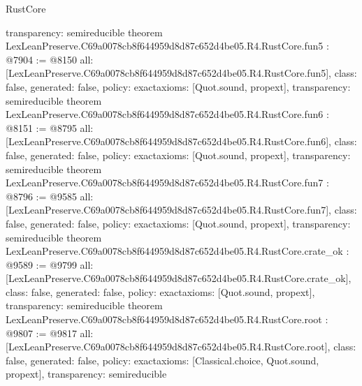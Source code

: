 \begin{lexlean}{RustCore}
\begin{coremodule}
{  transparency: semireducible
}
theorem LexLeanPreserve.C69a0078cb8f644959d8d87c652d4be05.R4.RustCore.fun5 : @7904 := @8150 {
  all: [LexLeanPreserve.C69a0078cb8f644959d8d87c652d4be05.R4.RustCore.fun5],
  class: false,
  generated: false,
  policy: exact{axioms: [Quot.sound, propext]},
  transparency: semireducible
}
theorem LexLeanPreserve.C69a0078cb8f644959d8d87c652d4be05.R4.RustCore.fun6 : @8151 := @8795 {
  all: [LexLeanPreserve.C69a0078cb8f644959d8d87c652d4be05.R4.RustCore.fun6],
  class: false,
  generated: false,
  policy: exact{axioms: [Quot.sound, propext]},
  transparency: semireducible
}
theorem LexLeanPreserve.C69a0078cb8f644959d8d87c652d4be05.R4.RustCore.fun7 : @8796 := @9585 {
  all: [LexLeanPreserve.C69a0078cb8f644959d8d87c652d4be05.R4.RustCore.fun7],
  class: false,
  generated: false,
  policy: exact{axioms: [Quot.sound, propext]},
  transparency: semireducible
}
theorem LexLeanPreserve.C69a0078cb8f644959d8d87c652d4be05.R4.RustCore.crate_ok : @9589 := @9799 {
  all: [LexLeanPreserve.C69a0078cb8f644959d8d87c652d4be05.R4.RustCore.crate_ok],
  class: false,
  generated: false,
  policy: exact{axioms: [Quot.sound, propext]},
  transparency: semireducible
}
theorem LexLeanPreserve.C69a0078cb8f644959d8d87c652d4be05.R4.RustCore.root : @9807 := @9817 {
  all: [LexLeanPreserve.C69a0078cb8f644959d8d87c652d4be05.R4.RustCore.root],
  class: false,
  generated: false,
  policy: exact{axioms: [Classical.choice, Quot.sound, propext]},
  transparency: semireducible
}


\end{coremodule}
\end{lexlean}
